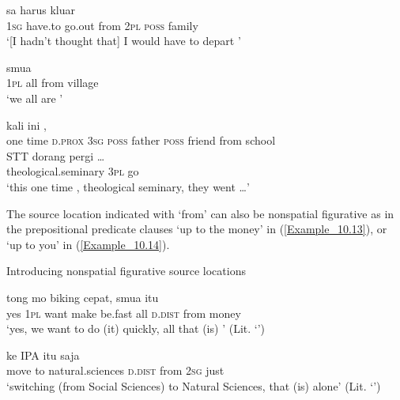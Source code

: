 \ea
\label{Example_10.10}
\gll {\ldots} {sa} {harus} {kluar} {} {} {} {}\\ %
  {}  \textsc{1sg}  have.to  go.out  from  \textsc{2pl}  \textsc{poss}  family\\
\glt 
‘[I hadn’t thought that] I would have to depart ’ \textstyleExampleSource{[080919-006-CvNP.0012]}
\z

\ea
\label{Example_10.11}
 {smua} {} {}\\ %
 \textsc{1pl}  all  from  village\\
\glt 
‘we all are ’ \textstyleExampleSource{[081010-001-Cv.0084]}
\z

\ea
\label{Example_10.12}
 {kali} {ini} {{}} {{}} {{}} {} {} {} {,}\\ %
 one  time  \textsc{d.prox}  {\textsc{3sg}}  {\textsc{poss}}  {father}  \textsc{poss}  friend  from  school\\
\gll \textsc{STT}  {dorang}  {pergi}  {\ldots}\\
 {theological.seminary}  {\textsc{3pl}}  {go}  {}\\
\glt 
‘this one time , theological seminary, they went {\ldots}’ \textstyleExampleSource{[081006-023-CvEx.0062]}
\z


The source location indicated with  ‘from’ can also be nonspatial figurative as in the prepositional predicate clauses  ‘up to the money’ in (\ref{Example_10.13}), or  ‘up to you’ in (\ref{Example_10.14}).


\begin{styleExampleTitle}
Introducing nonspatial figurative source locations
\end{styleExampleTitle}

\ea
\label{Example_10.13}
 {tong} {mo} {biking} {cepat,} {smua} {itu} {} {}\\ %
 yes  \textsc{1pl}  want  make  be.fast  all  \textsc{d.dist}  from  money\\
\glt 
‘yes, we want to do (it) quickly, all that (is) ’ (Lit. ‘’) \textstyleExampleSource{[080927-006-CvNP.0034]}
\z

\ea
\label{Example_10.14}
 {ke} {IPA} {itu} {} {} {saja}\\ %
 move  to  natural.sciences  \textsc{d.dist}  from  \textsc{2sg}  just\\
\glt 
‘switching (from Social Sciences) to Natural Sciences, that (is)  alone’ (Lit. ‘’) \textstyleExampleSource{[081023-004-Cv.0023]}
\z


